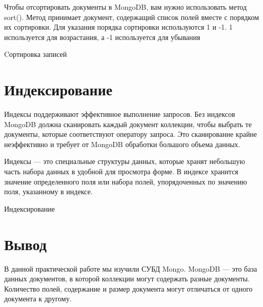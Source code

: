 Чтобы отсортировать документы в MongoDB, вам нужно использовать
метод sort(). Метод принимает документ, содержащий список полей вместе с
порядком их сортировки. Для указания порядка сортировки используются 1 и -1.
1 используется для возрастания, а -1 используется для убывания

\begin{image}
	\caption{Cортировка записей}
	\label{fig:sort}
\end{image}

\clearpage
\section{Индексирование}

Индексы поддерживают эффективное выполнение запросов. Без индексов
MongoDB должна сканировать каждый документ коллекции, чтобы выбрать те
документы, которые соответствуют оператору запроса. Это сканирование
крайне неэффективно и требует от MongoDB обработки большого объема
данных.\par
Индексы — это специальные структуры данных, которые хранят
небольшую часть набора данных в удобной для просмотра форме. В индексе
хранится значение определенного поля или набора полей, упорядоченных по
значению поля, указанному в индексе.

\begin{image}
	\caption{Индексирование}
	\label{fig:index}
\end{image}

\clearpage

\section*{\LARGE Вывод}
В данной практической работе мы изучили СУБД Mongo.
MongoDB --- это база данных
документов, в которой коллекции могут содержать разные документы.
Количество полей, содержание и размер документа могут отличаться от одного
документа к другому.

